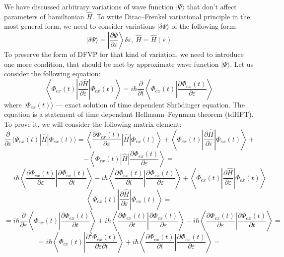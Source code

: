 We have discussed arbitrary variations of wave function $|\Psi\rangle$ that don't affect parameters of hamiltonian $\hat{H}$.
To write Dirac--Frenkel variational principle in the most general form, we need to consider variations $|\delta\Psi\rangle$ of the following form:
$$|\delta\Psi\rangle=\left|\frac{\partial\Psi}{\partial\varepsilon}\right\rangle\delta\varepsilon,\ \hat{H}=\hat{H}(\varepsilon)$$
To preserve the form of DFVP for that kind of variation, we need to introduce one more condition,
 that should be met by approximate wave function $|\Psi\rangle$.
Let us consider the following equation:
$$\left\langle\Phi_{ex}(t)\left|\frac{\partial\hat{H}}{\partial\varepsilon}\right|\Phi_{ex}(t)\right\rangle = %
  i\hbar\frac{\partial}{\partial t}\left\langle\Phi_{ex}(t)\left|\frac{\partial\Phi_{ex}(t)}{\partial\varepsilon}\right.\right\rangle$$
where $|\Phi_{ex}(t)\rangle$ --- exact solution of time dependent Shr\"{o}dinger equation.
The equation is a statement of time dependant Hellmann--Feynman theorem (tdHFT). 
To prove it, we will consider the following matrix element:
$$\frac{\partial}{\partial\varepsilon}\langle\Phi_{ex}(t)|\hat{H}|\Phi_{ex}(t)\rangle=%
				      \left\langle\frac{\partial\Phi_{ex}(t)}{\partial\varepsilon}\left|\hat{H}\right|\Phi_{ex}(t)\right\rangle+%
				      \left\langle\Phi_{ex}(t)\left|\frac{\partial\hat{H}}{\partial\varepsilon}\right|\Phi_{ex}(t)\right\rangle+$$
$$ 				     -\left\langle\Phi_{ex}(t)\left|\hat{H}\right|\frac{\partial\Phi_{ex}(t)}{\partial\varepsilon}\right\rangle=$$
$$=i\hbar\left\langle\frac{\partial\Phi_{ex}(t)}{\partial\varepsilon}\left|\frac{\partial\Phi_{ex}(t)}{\partial t}\right.\right\rangle-%
   i\hbar\left\langle\frac{\partial\Phi_{ex}(t)}{\partial t}\left|\frac{\partial\Phi_{ex}(t)}{\partial\varepsilon}\right.\right\rangle+
   \left\langle\Phi_{ex}(t)\left|\frac{\partial\hat{H}}{\partial\varepsilon}\right|\Phi_{ex}(t)\right\rangle$$
$$\left\langle\Phi_{ex}(t)\left|\frac{\partial\hat{H}}{\partial\varepsilon}\right|\Phi_{ex}(t)\right\rangle=$$
$$=i\hbar\frac{\partial}{\partial\varepsilon}\left\langle\Phi_{ex}(t)\left|\frac{\partial\Phi_{ex}(t)}{\partial t}\right.\right\rangle+%
   i\hbar\left\langle\frac{\partial\Phi_{ex}(t)}{\partial t}\left|\frac{\partial\Phi_{ex}(t)}{\partial\varepsilon}\right.\right\rangle-%
   i\hbar\left\langle\frac{\partial\Phi_{ex}(t)}{\partial\varepsilon}\left|\frac{\partial\Phi_{ex}(t)}{\partial t}\right.\right\rangle=$$
$$=i\hbar\left\langle\Phi_{ex}(t)\left|\frac{\partial^2\Phi_{ex}(t)}{\partial\varepsilon\partial t}\right.\right\rangle+%
   i\hbar\left\langle\frac{\partial\Phi_{ex}(t)}{\partial t}\left|\frac{\partial\Phi_{ex}(t)}{\partial\varepsilon}\right.\right\rangle=$$
